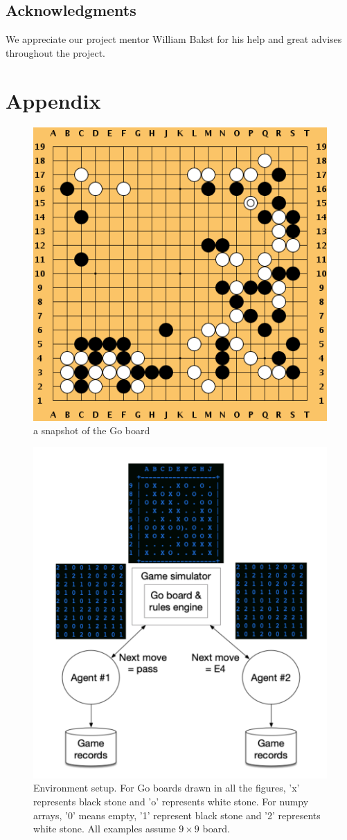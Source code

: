 \documentclass{article}
\begin{document}
\subsection*{Acknowledgments}
We appreciate our project mentor William Bakst for his help and great advises throughout the project.


 

\section*{Appendix}
\begin{figure}[H]
\begin{center}
\includegraphics[width=0.25\linewidth]{goboard}
\end{center}
\caption{a snapshot of the Go board}
\label{fig:goboard}
\end{figure}

\begin{figure}[H]
\centering
\includegraphics[width=0.8\linewidth]{simulator}
\caption{Environment setup. For Go boards drawn in all the figures, 'x' represents black stone and 'o' represents white stone. For numpy arrays, '0' means empty, '1' represent black stone and '2' represents white stone. All examples assume $9 \times 9$ board.}
\label{fig:env}
\end{figure}
\end{document}
